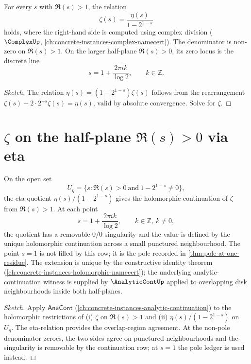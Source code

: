 \begin{theorem}
\label{thm:eta-relation-zeta}
For every \(s\) with \(\Re(s) > 1\), the relation
$$\zeta(s) = \frac{\eta(s)}{1 - 2^{1-s}}$$
holds, where the right-hand side is computed using complex division (\(\ComplexUp\), \autoref{ch:concrete-instances-complex-namecert}). The denominator is non-zero on \(\Re(s)>1\). On the larger half-plane \(\Re(s)>0\), its zero locus is the discrete line
$$
s=1+\frac{2\pi i k}{\log 2},\qquad k\in\mathbb Z.
$$
\end{theorem}
\begin{proof}[Sketch]
The relation \(\eta(s) = (1 - 2^{1-s}) \zeta(s)\) follows from the rearrangement \(\zeta(s) - 2 \cdot 2^{-s} \zeta(s) = \eta(s)\), valid by absolute convergence. Solve for \(\zeta\).
\end{proof}

\section{\(\zeta\) on the half-plane \(\Re(s) > 0\) via eta}

\begin{theorem}[\(\zeta\) on \(\Re(s) > 0\)]
\label{thm:zeta-on-positive-half-plane}
On the open set
$$
U_{\eta}=\{s:\Re(s)>0\ \text{and}\ 1-2^{1-s}\neq0\},
$$
the eta quotient \(\eta(s)/(1-2^{1-s})\) gives the holomorphic continuation of \(\zeta\) from \(\Re(s)>1\). At each point
$$
s=1+\frac{2\pi i k}{\log 2},\qquad k\in\mathbb Z,\ k\neq0,
$$
the quotient has a removable \(0/0\) singularity and the value is defined by the unique holomorphic continuation across a small punctured neighbourhood. The point \(s=1\) is not filled by this row; it is the pole recorded in \autoref{thm:pole-at-one-residue}. The extension is unique by the constructive identity theorem (\autoref{ch:concrete-instances-holomorphic-namecert}); the underlying analytic-continuation witness is supplied by \(\AnalyticContUp\) applied to overlapping disk neighbourhoods inside both half-planes.
\end{theorem}
\begin{proof}[Sketch]
Apply \(\mathsf{AnaCont}\) (\autoref{ch:concrete-instances-analytic-continuation}) to the holomorphic restrictions of (i) \(\zeta\) on \(\Re(s) > 1\) and (ii) \(\eta(s)/(1 - 2^{1-s})\) on \(U_{\eta}\). The eta-relation provides the overlap-region agreement. At the non-pole denominator zeroes, the two sides agree on punctured neighbourhoods and the singularity is removable by the continuation row; at \(s=1\) the pole ledger is used instead.
\end{proof}

